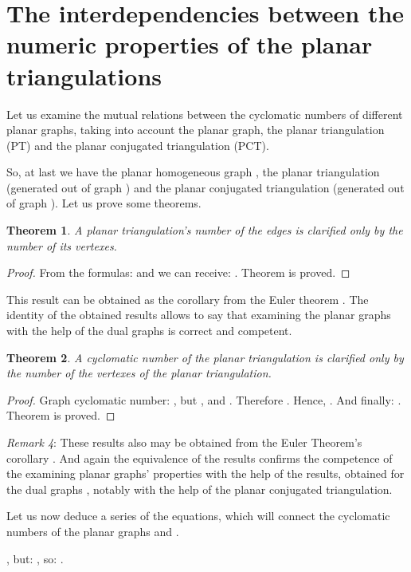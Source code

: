 \documentclass{amsart}
\newtheorem{theorem}{Theorem}
\theoremstyle{plain}
\numberwithin{equation}{section}
\begin{document}
\section{The interdependencies between the numeric properties of the planar triangulations}

Let us examine the mutual relations between the cyclomatic numbers of different planar graphs, taking into account the planar graph, the planar triangulation (PT) and the planar conjugated triangulation (PCT).

So, at last we have the planar homogeneous graph , the planar triangulation  (generated out of graph ) and the planar conjugated triangulation  (generated out of graph ). Let us prove some theorems.

\begin{theorem}
A planar triangulation's number of the edges is clarified only by the number of its vertexes.
\end {theorem}

\begin{proof}
From the formulas:  and  we can receive: . Theorem is proved.
\end {proof}

This result can be obtained as the corollary from the Euler theorem \cite {Harary}. The identity of the obtained results allows to say that examining the planar graphs with the help of the dual graphs is correct and competent.

\begin{theorem}
A cyclomatic number of the planar triangulation is clarified only by the number of the vertexes of the planar triangulation.
\end {theorem}

\begin{proof}
Graph  cyclomatic number: , but , and . Therefore . Hence, . And finally: . Theorem is proved.
\end{proof}

\textit{Remark 4}: These results also may be obtained from the Euler Theorem's corollary \cite {Harary}. And again the equivalence of the results confirms the competence of the examining planar graphs' properties with the help of the results, obtained for the dual graphs \cite {Malinin}, notably with the help of the planar conjugated triangulation.

Let us now deduce a series of the equations, which will connect the cyclomatic numbers of the planar graphs  and .

, but: , so: .
\end{document}
